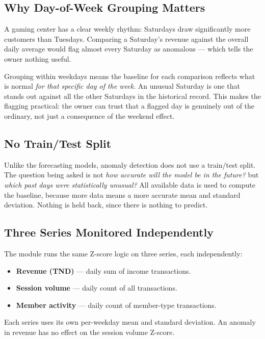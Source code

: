 \subsection{Why Day-of-Week Grouping Matters}

A gaming center has a clear weekly rhythm: Saturdays draw significantly more customers
than Tuesdays. Comparing a Saturday's revenue against the overall daily average would
flag almost every Saturday as anomalous --- which tells the owner nothing useful.

Grouping within weekdays means the baseline for each comparison reflects what is normal
\textit{for that specific day of the week}. An unusual Saturday is one that stands out
against all the other Saturdays in the historical record. This makes the flagging
practical: the owner can trust that a flagged day is genuinely out of the ordinary,
not just a consequence of the weekend effect.

\subsection{No Train/Test Split}

Unlike the forecasting models, anomaly detection does not use a train/test split. The
question being asked is not \textit{how accurate will the model be in the future?} but
\textit{which past days were statistically unusual?} All available data is used to
compute the baseline, because more data means a more accurate mean and standard
deviation. Nothing is held back, since there is nothing to predict.

\subsection{Three Series Monitored Independently}

The module runs the same Z-score logic on three series, each independently:

\begin{itemize}[noitemsep]
  \item \textbf{Revenue (TND)} --- daily sum of income transactions.
  \item \textbf{Session volume} --- daily count of all transactions.
  \item \textbf{Member activity} --- daily count of member-type transactions.
\end{itemize}

Each series uses its own per-weekday mean and standard deviation. An anomaly in
revenue has no effect on the session volume Z-score.


